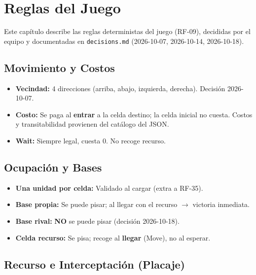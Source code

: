 \chapter{Reglas del Juego}
\label{ch:reglas}

Este capítulo describe las reglas deterministas del juego (RF-09), decididas por el equipo
y documentadas en \texttt{decisions.md} (2026-10-07, 2026-10-14, 2026-10-18).

\section{Movimiento y Costos}
\label{sec:movimiento-costos}

\begin{itemize}
\item \textbf{Vecindad:} 4 direcciones (arriba, abajo, izquierda, derecha). Decisión 2026-10-07.
\item \textbf{Costo:} Se paga al \textbf{entrar} a la celda destino; la celda inicial no cuesta.
  Costos y transitabilidad provienen del catálogo  del JSON.
\item \textbf{Wait:} Siempre legal, cuesta 0. No recoge recurso.
\end{itemize}

\section{Ocupación y Bases}
\label{sec:ocupacion-bases}

\begin{itemize}
\item \textbf{Una unidad por celda:} Validado al cargar (extra a RF-35).
\item \textbf{Base propia:} Se puede pisar; al llegar con el recurso $\to$ victoria inmediata.
\item \textbf{Base rival:} \textbf{NO} se puede pisar (decisión 2026-10-18).
\item \textbf{Celda recurso:} Se pisa; recoge al \textbf{llegar} (Move), no al esperar.
\end{itemize}

\section{Recurso e Interceptación (Placaje)}
\label{sec:recurso-interceptacion}

